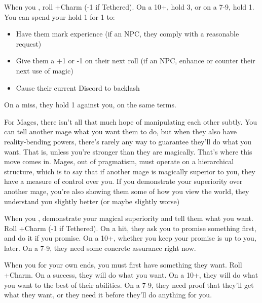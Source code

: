 \begin{multicols}{3}
  \begin{move}
    When you , roll
    +Charm (-1 if Tethered). On a 10+, hold 3, or on a 7-9, hold
    1. You can spend your hold 1 for 1 to:
    \begin{itemize}
      \setlength\itemsep{-.5em}
    \item Have them mark experience (if an NPC, they comply with a
      reasonable request)
    \item Give them a +1 or -1 on their next roll (if an NPC, enhance
      or counter their next use of magic)
    \item Cause their current Discord to backlash
    \end{itemize}
    On a miss, they hold 1 against you, on the same terms.
\begin{movedetail}
  For Mages, there isn't all that much hope of manipulating each other
  subtly. You can tell another mage what you want them to do, but when
  they also have reality-bending powers, there's rarely any way to
  guarantee they'll do what you want. That is, unless you're stronger
  than they are magically. That's where this move comes in. Mages, out
  of pragmatism, must operate on a hierarchical structure, which is to
  say that if another mage is magically superior to you, they have a
  measure of control over you. If you demonstrate your superiority
  over another mage, you're also showing them some of how you view the
  world, they understand you slightly better (or maybe slightly worse)
\end{movedetail}
  \end{move}

  \SEPARATOR

  \begin{move}
    When you ,
    demonstrate your magical superiority and tell them what you
    want. Roll +Charm (-1 if Tethered). On a hit, they ask you to
    promise something first, and do it if you promise. On a 10+,
    whether you keep your promise is up to you, later. On a 7-9, they
    need some concrete assurance right now.
  \end{move}

  \SEPARATOR

  \begin{move}
    When you  for your own ends, you must first
    have something they want. Roll +Charm. On a success, they will do
    what you want. On a 10+, they will do what you want to the best of
    their abilities. On a 7-9, they need proof that they'll get what
    they want, or they need it before they'll do anything for you.
  \end{move}


\end{multicols}
